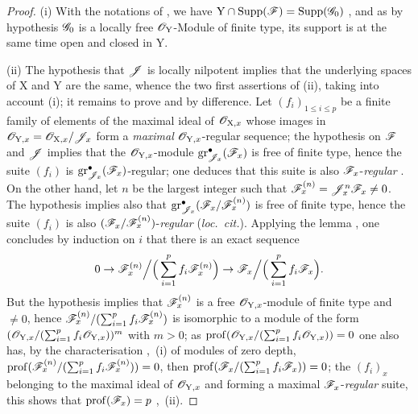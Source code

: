 \begin{proof}
(i) With the notations of , we have $\mathrm{Y}\cap\operatorname{Supp}(\mathscr{F})=\operatorname{Supp}(\mathscr{G}_0)$ , and as by hypothesis $\mathscr{G}_0$ is a locally free $\mathscr{O}_\mathrm{Y}$-Module of finite type, its support is at the same time open and closed in $\mathrm{Y}$.


(ii) The hypothesis that $\mathscr{J}$ is locally nilpotent implies that the underlying spaces of $\mathrm{X}$ and $\mathrm{Y}$ are the same, whence the two first assertions of (ii), taking into account (i); it remains to prove  and  by difference. Let $(f_i)_{1\leqslant i\leqslant p}$ be a finite family of elements of the maximal ideal of $\mathscr{O}_{\mathrm{X},x}$ whose images in $\mathscr{O}_{\mathrm{Y},x}=\mathscr{O}_{\mathrm{X},x}/\mathscr{J}_x$ form a \emph{maximal} $\mathscr{O}_{\mathrm{Y},x}$-regular sequence; the hypothesis on $\mathscr{F}$ and $\mathscr{J}$ implies that the $\mathscr{O}_{\mathrm{Y},x}$-module $\operatorname{gr}^{\bullet}_{\mathscr{J}_x}(\mathscr{F}_x)$ is free of finite type, hence the suite $(f_i)$ is $\operatorname{gr}^{\bullet}_{\mathscr{J}_x}(\mathscr{F}_x)$-regular; one deduces that this suite is also $\mathscr{F}_x$-\emph{regular} . On the other hand, let $n$ be the largest integer such that $\mathscr{F}^{(n)}_x=\mathscr{J}^n_x\mathscr{F}_x\neq 0$. The hypothesis implies also that $\operatorname{gr}^{\bullet}_{\mathscr{J}_x}(\mathscr{F}_x/\mathscr{F}^{(n)}_x)$ is free of finite type, hence the suite $(f_i)$ is also $(\mathscr{F}_x/\mathscr{F}^{(n)}_x)$-\emph{regular} (\emph{loc.\ cit.}). Applying the lemma , one concludes by induction on $i$ that there is an exact sequence
\[
0\to\mathscr{F}^{(n)}_x\Big/\Big(\sum_{i=1}^p f_i\mathscr{F}^{(n)}_x\Big) \to \mathscr{F}_x\Big/\Big(\sum_{i=1}^p f_i\mathscr{F}_x\Big).
\]
But the hypothesis implies that $\mathscr{F}^{(n)}_x$ is a free $\mathscr{O}_{\mathrm{Y},x}$-module of finite type and $\neq 0$, hence $\mathscr{F}^{(n)}_x/(\sum_{i=1}^p f_i\mathscr{F}^{(n)}_x)$ is isomorphic to a module of the form $(\mathscr{O}_{\mathrm{Y},x}/(\sum_{i=1}^p f_i\mathscr{O}_{\mathrm{Y},x}))^m$ with $m>0$; as $\operatorname{prof}(\mathscr{O}_{\mathrm{Y},x}/(\sum_{i=1}^p f_i\mathscr{O}_{\mathrm{Y},x}))=0$  one also has, by the characterisation ,~(i) of modules of zero depth, $\operatorname{prof}(\mathscr{F}^{(n)}_x/(\sum_{i=1}^p f_i\mathscr{F}^{(n)}_x))=0$, then $\operatorname{prof}(\mathscr{F}_x/(\sum_{i=1}^p f_i\mathscr{F}_x))=0$; the $(f_i)_x$ belonging to the maximal ideal of $\mathscr{O}_{\mathrm{Y},x}$ and forming a maximal $\mathscr{F}_x$-\emph{regular} suite, this shows that $\operatorname{prof}(\mathscr{F}_x)=p$ ,~(ii).
\end{proof}

